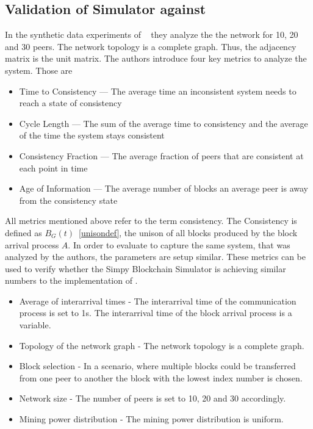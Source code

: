 \subsection{Validation of Simulator against \gopalan}\label{gopalananalysis}
In the synthetic data experiments of \gopalan~  they analyze the the network for 10, 20 and 30 peers. The network topology is a complete graph. Thus, the adjacency matrix is the unit matrix. 
The authors introduce four key metrics to analyze the system. Those are 
\begin{itemize}
\item Time to Consistency --- The average time an inconsistent system needs to reach a state of consistency
\item Cycle Length --- The sum of the average time to consistency and the average of the time the system stays consistent
\item Consistency Fraction --- The average fraction of peers that are consistent at each point in time
\item Age of Information --- The average number of blocks an average peer is away from the consistency state
\end{itemize}
All metrics mentioned above refer to the term consistency. The Consistency is defined as $B_G(t)$~\ref{unisondef}, the unison of all blocks produced by the block arrival process $A$.
In order to evaluate to capture the same system, that was analyzed by the authors, the parameters are setup similar.
These metrics can be used to verify whether the Simpy Blockchain Simulator is achieving similar numbers to the implementation of \gopalan . 
\begin{itemize}
\item Average of interarrival times - The interarrival time of the communication process is set to 1s. The interarrival time of the block arrival process is a variable.
\item Topology of the network graph - The network topology is a complete graph.
\item Block selection - In a scenario, where multiple blocks could be transferred from one peer to another the block with the lowest index number is chosen.
\item Network size - The number of peers is set to 10, 20 and 30 accordingly.
\item Mining power distribution - The mining power distribution is uniform.
\end{itemize}

